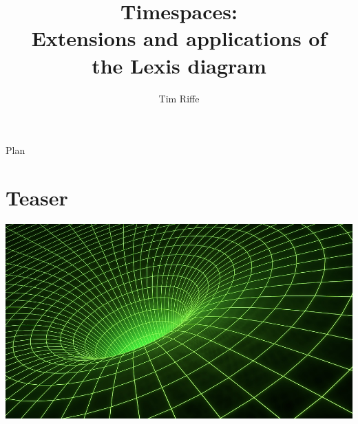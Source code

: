 \documentclass[20pt]{beamer}
\title{Timespaces:\\Extensions and applications of \\ the Lexis diagram}
\subtitle{Tim Riffe}		%
\begin{document}

\begin{frame}
	\titlepage
\end{frame}

\begin{frame}{Plan}
\tableofcontents
\end{frame}

\section{Teaser}

\begin{frame}
\vspace{-15em}
\begin{center}
\vspace{4.25cm}
\hspace*{-6cm}\includegraphics[scale=1]{Figures/spacegrid.jpg}
\end{center}
\end{frame}
%
\end{document}
